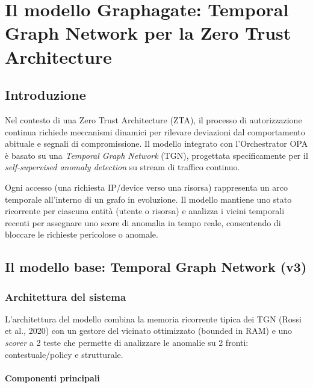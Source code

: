 \chapter{Il modello Graphagate: Temporal Graph Network per la Zero Trust Architecture}

\section{Introduzione}

Nel contesto di una Zero Trust Architecture (ZTA), il processo di autorizzazione continua richiede meccanismi dinamici per rilevare deviazioni dal comportamento abituale e segnali di compromissione. Il modello integrato con l'Orchestrator OPA è basato su una \textit{Temporal Graph Network} (TGN), progettata specificamente per il \textit{self-supervised anomaly detection} su stream di traffico continuo.

Ogni accesso (una richiesta IP/device verso una risorsa) rappresenta un arco temporale all'interno di un grafo in evoluzione. Il modello mantiene uno stato ricorrente per ciascuna entità (utente o risorsa) e analizza i vicini temporali recenti per assegnare uno score di anomalia in tempo reale, consentendo di bloccare le richieste pericolose o anomale.

\section{Il modello base: Temporal Graph Network (v3)}
\label{sec:v3}

\subsection{Architettura del sistema}

L'architettura del modello combina la memoria ricorrente tipica dei TGN (Rossi et al., 2020) con un gestore del vicinato ottimizzato (bounded in RAM) e uno \textit{scorer} a 2 teste che permette di analizzare le anomalie su 2 fronti: contestuale/policy e strutturale.

\subsubsection{Componenti principali}

